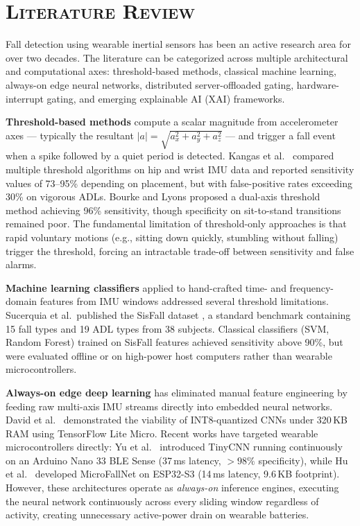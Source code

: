 
\chapter{\scshape Literature Review}

Fall detection using wearable inertial sensors has been an active research area for over two decades. The literature can be categorized across multiple architectural and computational axes: threshold-based methods, classical machine learning, always-on edge neural networks, distributed server-offloaded gating, hardware-interrupt gating, and emerging explainable AI (XAI) frameworks.

\textbf{Threshold-based methods} compute a scalar magnitude from accelerometer axes --- typically the resultant $|a| = \sqrt{a_x^2 + a_y^2 + a_z^2}$ --- and trigger a fall event when a spike followed by a quiet period is detected. Kangas et al.\ \cite{kangas2008comparison} compared multiple threshold algorithms on hip and wrist IMU data and reported sensitivity values of 73--95\% depending on placement, but with false-positive rates exceeding 30\% on vigorous ADLs. Bourke and Lyons \cite{bourke2008threshold} proposed a dual-axis threshold method achieving 96\% sensitivity, though specificity on sit-to-stand transitions remained poor. The fundamental limitation of threshold-only approaches is that rapid voluntary motions (e.g., sitting down quickly, stumbling without falling) trigger the threshold, forcing an intractable trade-off between sensitivity and false alarms.

\textbf{Machine learning classifiers} applied to hand-crafted time- and frequency-domain features from IMU windows addressed several threshold limitations. Sucerquia et al.\ published the SisFall dataset \cite{sucerquia2017sisfall}, a standard benchmark containing 15 fall types and 19 ADL types from 38 subjects. Classical classifiers (SVM, Random Forest) trained on SisFall features achieved sensitivity above 90\%, but were evaluated offline or on high-power host computers rather than wearable microcontrollers.

\textbf{Always-on edge deep learning} has eliminated manual feature engineering by feeding raw multi-axis IMU streams directly into embedded neural networks. David et al.\ \cite{david2021tensorflow} demonstrated the viability of INT8-quantized CNNs under 320\,KB RAM using TensorFlow Lite Micro. Recent works have targeted wearable microcontrollers directly: Yu et al.\ \cite{yu2023tinycnn} introduced TinyCNN running continuously on an Arduino Nano 33 BLE Sense (37\,ms latency, $>98\%$ specificity), while Hu et al.\ \cite{hu2025microfallnet} developed MicroFallNet on ESP32-S3 (14\,ms latency, 9.6\,KB footprint). However, these architectures operate as \textit{always-on} inference engines, executing the neural network continuously across every sliding window regardless of activity, creating unnecessary active-power drain on wearable batteries.

